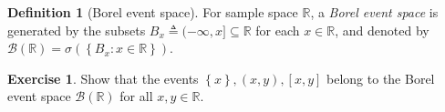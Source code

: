 \documentclass[letterpaper,10pt,english]{article}
\theoremstyle{plain}
\theoremstyle{definition}
\newtheorem{defn}[thm]{Definition}
\newtheorem{exmp}[thm]{Example}
\newtheorem{exerc}[thm]{Exercise}
\theoremstyle{remark}
\newcommand{\EQ}[1]{\begin{equation*}#1\end{equation*}}
\newcommand{\set}[1]{\left\{#1\right\}}
\newcommand{\N}{\mathbb{N}}
\newcommand{\R}{\mathbb{R}}
\newcommand{\sB}{\mathscr{B}}
\newcommand{\sF}{\mathscr{F}}
\renewcommand{\le}{\leqslant}
\begin{document}
\begin{defn}[Borel event space] 
For sample space $\R$, 
a \emph{Borel event space} is generated by the subsets $B_x \triangleq (-\infty, x] \subseteq \R$ for each $x \in \R$, 
and denoted by $\sB(\R) = \sigma(\set{B_x: x \in \R})$. 
\end{defn}
\begin{tcolorbox}
\begin{exerc}
Show that the events $\set{x}, (x, y), [x, y]$ belong to the Borel event space $\sB(\R)$ for all $x, y \in \R$.  
\end{exerc}
\end{tcolorbox}
\end{document}
